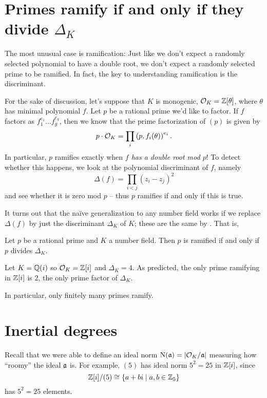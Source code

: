\section{Primes ramify if and only if they divide $\Delta_K$}
The most unusual case is ramification:
Just like we don't expect a randomly selected polynomial to have a double root,
we don't expect a randomly selected prime to be ramified.
In fact, the key to understanding ramification is the discriminant.

For the sake of discussion, let's suppose that $K$ is monogenic,
$\OO_K = \ZZ[\theta]$, where $\theta$ has minimal polynomial $f$.
Let $p$ be a rational prime we'd like to factor.
If $f$ factors as $f_1^{e_1} \dots f_g^{e_g}$, then we know that
the prime factorization of $(p)$ is given by
\[ p \cdot \OO_K = \prod_i \left( p, f_i(\theta) \right)^{e_i}. \]
In particular, $p$ ramifies exactly when \emph{$f$ has a double root mod $p$}!
To detect whether this happens, we look at the polynomial discriminant of $f$,
namely
\[ \Delta(f) = \prod_{i<j} (z_i - z_j)^2 \]
and see whether it is zero mod $p$ -- thus $p$ ramifies if and only if this is true.

It turns out that the na\"ive generalization to any number field
works if we replace $\Delta(f)$ by just the discriminant $\Delta_K$ of $K$;
these are the same by .
That is,
\begin{theorem}
	Let $p$ be a rational prime and $K$ a number field.
	Then $p$ is ramified if and only if $p$ divides $\Delta_K$.
\end{theorem}
\begin{example}
	Let $K = \QQ(i)$ so $\OO_K = \ZZ[i]$ and $\Delta_K = 4$.
	As predicted, the only prime ramifying in $\ZZ[i]$ is $2$,
	the only prime factor of $\Delta_K$.
\end{example}
In particular, only finitely many primes ramify.

\section{Inertial degrees}

Recall that we were able to define an ideal norm
$\Norm(\aa) = \left\lvert \OO_K / \aa \right\rvert$
measuring how ``roomy'' the ideal $\aa$ is.
For example, $(5)$ has ideal norm $5^2 = 25$ in $\ZZ[i]$, since
\[ \ZZ[i] / (5) \cong \left\{ a+bi \mid a,b \in \Zc5 \right\} \]
has $5^2 = 25$ elements.

